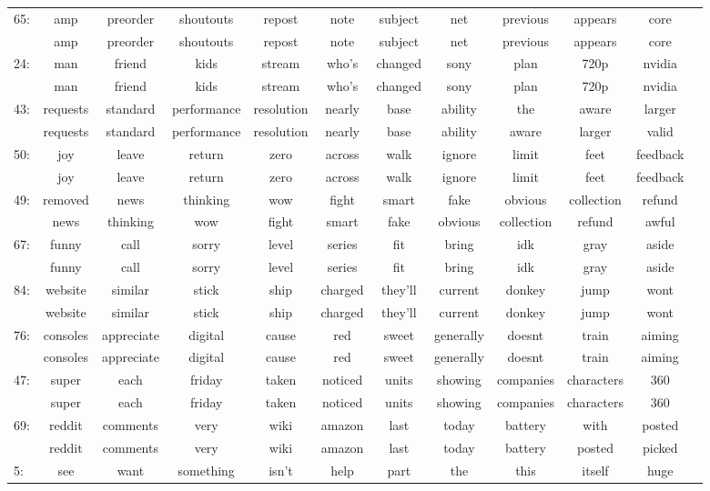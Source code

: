 \documentclass[11pt]{article} %
\begin{document}
\begin{landscape}
\begin{tabular}{|l|c c c c c c c c c c c}
65: &  amp&preorder&shoutouts&repost&note&subject&net&previous&appears&core\\
        & amp&preorder&shoutouts&repost&note&subject&net&previous&appears&core\\
24: &  man&friend&kids&stream&who's&changed&sony&plan&720p&nvidia\\
        & man&friend&kids&stream&who's&changed&sony&plan&720p&nvidia\\
43: &  requests&standard&performance&resolution&nearly&base&ability&the&aware&larger\\
        & requests&standard&performance&resolution&nearly&base&ability&aware&larger&valid\\
50: &  joy&leave&return&zero&across&walk&ignore&limit&feet&feedback\\
        & joy&leave&return&zero&across&walk&ignore&limit&feet&feedback\\
49: &  removed&news&thinking&wow&fight&smart&fake&obvious&collection&refund\\
        & news&thinking&wow&fight&smart&fake&obvious&collection&refund&awful\\
67: &  funny&call&sorry&level&series&fit&bring&idk&gray&aside\\
        & funny&call&sorry&level&series&fit&bring&idk&gray&aside\\
84: &  website&similar&stick&ship&charged&they'll&current&donkey&jump&wont\\
        & website&similar&stick&ship&charged&they'll&current&donkey&jump&wont\\
76: &  consoles&appreciate&digital&cause&red&sweet&generally&doesnt&train&aiming\\
        & consoles&appreciate&digital&cause&red&sweet&generally&doesnt&train&aiming\\
47: &  super&each&friday&taken&noticed&units&showing&companies&characters&360\\
        & super&each&friday&taken&noticed&units&showing&companies&characters&360\\
69: &  reddit&comments&very&wiki&amazon&last&today&battery&with&posted\\
        & reddit&comments&very&wiki&amazon&last&today&battery&posted&picked\\
5: &  see&want&something&isn't&help&part&the&this&itself&huge\\

\end{tabular}
\end{landscape}
\end{document}
